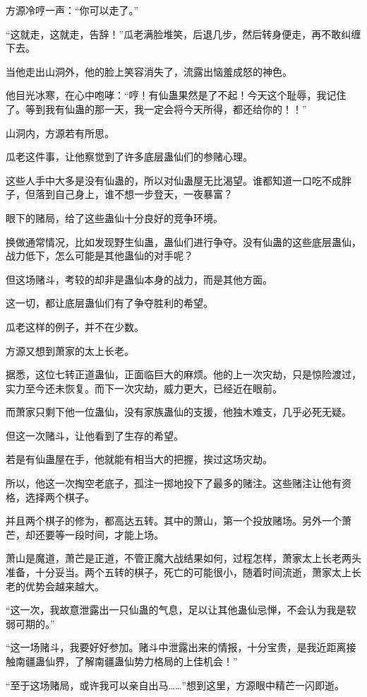 \begin{this_body}
方源冷哼一声：“你可以走了。”

“这就走，这就走，告辞！”瓜老满脸堆笑，后退几步，然后转身便走，再不敢纠缠下去。

当他走出山洞外，他的脸上笑容消失了，流露出恼羞成怒的神色。

他目光冰寒，在心中咆哮：“哼！有仙蛊果然是了不起！今天这个耻辱，我记住了。等到我有仙蛊的那一天，我一定会将今天所得，都还给你的！！”

山洞内，方源若有所思。

瓜老这件事，让他察觉到了许多底层蛊仙们的参赌心理。

这些人手中大多是没有仙蛊的，所以对仙蛊屋无比渴望。谁都知道一口吃不成胖子，但落到自己身上，谁不想一步登天，一夜暴富？

眼下的赌局，给了这些蛊仙十分良好的竞争环境。

换做通常情况，比如发现野生仙蛊，蛊仙们进行争夺。没有仙蛊的这些底层蛊仙，战力低下，怎么可能是其他蛊仙的对手呢？

但这场赌斗，考较的却非是蛊仙本身的战力，而是其他方面。

这一切，都让底层蛊仙们有了争夺胜利的希望。

瓜老这样的例子，并不在少数。

方源又想到萧家的太上长老。

据悉，这位七转正道蛊仙，正面临巨大的麻烦。他的上一次灾劫，只是惊险渡过，实力至今还未恢复。而下一次灾劫，威力更大，已经近在眼前。

而萧家只剩下他一位蛊仙，没有家族蛊仙的支援，他独木难支，几乎必死无疑。

但这一次赌斗，让他看到了生存的希望。

若是有仙蛊屋在手，他就能有相当大的把握，挨过这场灾劫。

所以，他这一次掏空老底子，孤注一掷地投下了最多的赌注。这些赌注让他有资格，选择两个棋子。

并且两个棋子的修为，都高达五转。其中的萧山，第一个投放赌场。另外一个萧芒，却还要等一段时间，才能上场。

萧山是魔道，萧芒是正道，不管正魔大战结果如何，过程怎样，萧家太上长老两头准备，十分妥当。两个五转的棋子，死亡的可能很小，随着时间流逝，萧家太上长老的优势会越来越大。

“这一次，我故意泄露出一只仙蛊的气息，足以让其他蛊仙忌惮，不会认为我是软弱可期的。”

“这一场赌斗，我要好好参加。赌斗中泄露出来的情报，十分宝贵，是我近距离接触南疆蛊仙界，了解南疆蛊仙势力格局的上佳机会！”

“至于这场赌局，或许我可以亲自出马……”想到这里，方源眼中精芒一闪即逝。

\end{this_body}

